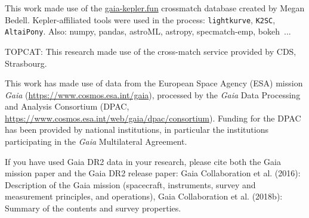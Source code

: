 \documentclass{aa}
\begin{document}
\begin{acknowledgements}
This work made use of the \url{gaia-kepler.fun} crossmatch database created by Megan Bedell.
Kepler-affiliated tools were used in the process: \texttt{lightkurve}, \texttt{K2SC}, \texttt{AltaiPony}.
Also: numpy, pandas, astroML, astropy, specmatch-emp, bokeh~\citep{bokeh}...

TOPCAT: This research made use of the cross-match service provided by CDS, Strasbourg.

This work has made use of data from the European Space Agency (ESA) mission
{\it Gaia} (\url{https://www.cosmos.esa.int/gaia}), processed by the {\it Gaia}
Data Processing and Analysis Consortium (DPAC,
\url{https://www.cosmos.esa.int/web/gaia/dpac/consortium}). Funding for the DPAC
has been provided by national institutions, in particular the institutions
participating in the {\it Gaia} Multilateral Agreement.

If you have used Gaia DR2 data in your research, please cite both the Gaia mission paper and the Gaia DR2 release paper:
Gaia Collaboration et al. (2016): Description of the Gaia mission (spacecraft, instruments, survey and measurement principles, and operations), Gaia Collaboration et al. (2018b): Summary of the contents and survey properties.


\end{acknowledgements}
\end{document}
